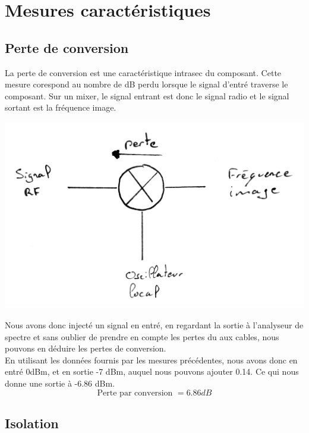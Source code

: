 \documentclass[a4paper,12pt]{report}            %
\begin{document}
\chapter{Mesures caractéristiques}
\section{Perte de conversion}
    La perte de conversion est une caractéristique intrasec du composant. Cette mesure
corespond au nombre de dB perdu lorsque le signal d'entré traverse le composant.
Sur un mixer, le signal entrant est donc le signal radio et le signal sortant est la
fréquence image.  
\begin{center}\includegraphics[scale = 0.3]{pic/perte_conversion.png}\\ \end{center}
Nous avons donc injecté un signal en entré, en regardant la sortie à l'analyseur de spectre
et sans oublier de prendre en compte les pertes du aux cables,
nous pouvons en déduire les pertes de conversion. \\
En utilisant les données fournis par les mesures précédentes, nous avons donc en entré 0dBm, 
et en sortie -7 dBm, auquel nous pouvons ajouter 0.14. Ce qui nous donne une
sortie à -6.86 dBm.
$$ \mbox{Perte par conversion }= 6.86 dB$$


\newpage
\section{Isolation}
\end{document}
